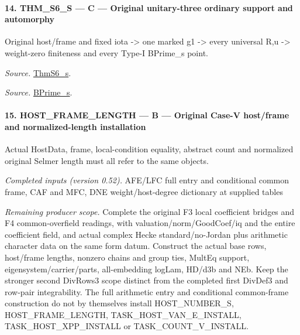 \documentclass[11pt,a4paper]{article}
\numberwithin{equation}{section}
\theoremstyle{remark}\newtheorem{remark}[theorem]{Remark}
\begin{document}
\paragraph{14. THM\_\allowbreak S6\_\allowbreak S — C — Original unitary-three ordinary support and automorphy}

Original host/frame and fixed iota -> one marked g1 -> every universal R,u -> weight-zero finiteness and every Type-I BPrime\_\allowbreak s point.

\emph{Source.} \href{https://github.com/CocoSgt/riemann-hypothesis-lean/blob/7cbf7a0c32fca1badf05931879a37c3f8a2b03b4/src/Development/AutomorphicArithmetic/AutomorphicVarieties/ModularityArgument/ThresholdArguments/DenseThresholdCases/ThmS6CoreS.lean#L17-L26}{ThmS6\_\allowbreak s}.

\emph{Source.} \href{https://github.com/CocoSgt/riemann-hypothesis-lean/blob/7cbf7a0c32fca1badf05931879a37c3f8a2b03b4/src/Development/AutomorphicArithmetic/AutomorphicVarieties/ModularityArgument/ThresholdArguments/DenseThresholdCases/ThmS6CoreS.lean#L12-L16}{BPrime\_\allowbreak s}.



\paragraph{15. HOST\_\allowbreak FRAME\_\allowbreak LENGTH — B — Original Case-V host/frame and normalized-length installation}

Actual HostData, frame, local-condition equality, abstract count and normalized original Selmer length must all refer to the same objects.

\emph{Completed inputs (version 0.52).} AFE/LFC full entry and conditional common frame, CAF and MFC, DNE weight/host-degree dictionary at supplied tables

\emph{Remaining producer scope.} Complete the original F3 local coefficient bridges and F4 common-overfield readings, with valuation/norm/GoodCoef/iq and the entire coefficient field, and actual complex Hecke standard/no-Jordan plus arithmetic character data on the same form datum. Construct the actual base rows, host/frame lengths, nonzero chains and group ties, MultEq support, eigensystem/carrier/parts, all-embedding logLam, HD/d3b and NEb. Keep the stronger second DivRows3 scope distinct from the completed first DivDef3 and row-pair integrability. The full arithmetic entry and conditional common-frame construction do not by themselves install HOST\_\allowbreak NUMBER\_\allowbreak S, HOST\_\allowbreak FRAME\_\allowbreak LENGTH, TASK\_\allowbreak HOST\_\allowbreak VAN\_\allowbreak E\_\allowbreak INSTALL, TASK\_\allowbreak HOST\_\allowbreak XPP\_\allowbreak INSTALL or TASK\_\allowbreak COUNT\_\allowbreak V\_\allowbreak INSTALL.
\end{document}
